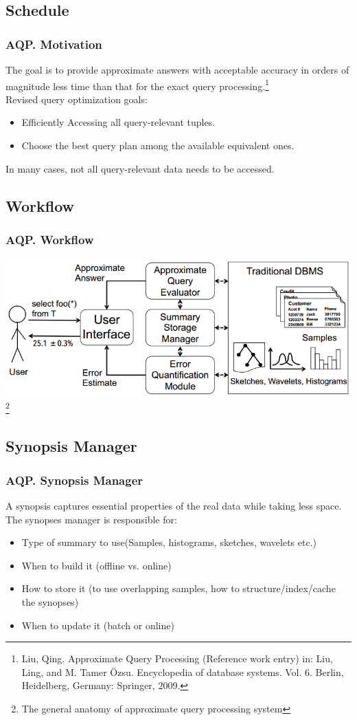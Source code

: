 \documentclass{beamer}
\begin{document}
\subsection{Schedule}
\begin{frame}
\frametitle{AQP. Motivation}
The goal is to provide approximate answers with acceptable accuracy in orders of magnitude less time than that for the exact query processing.\footnote{Liu, Qing. Approximate Query Processing (Reference work entry) in: Liu, Ling, and M. Tamer Özsu. Encyclopedia of database systems. Vol. 6. Berlin, Heidelberg, Germany: Springer, 2009.}\\
\vspace{0.3 cm}
Revised query optimization goals:
\begin{itemize}
\item{Efficiently Accessing all query-relevant tuples.}
\item{Choose the best query plan among the available equivalent ones.}
\end{itemize}
In many cases, not all query-relevant data needs to be accessed.

\end{frame}

\subsection{Workflow}
\begin{frame}
\frametitle{AQP. Workflow}
\includegraphics[scale=0.5]{img/blinkdb-workflow.png}
\footnote{The general anatomy of approximate query processing system}
\end{frame}

\subsection{Synopsis Manager}
\begin{frame}
\frametitle{AQP. Synopsis Manager}
A synopsis captures essential properties of the real data while taking less space.\\
\vspace{0.3 cm}
The synopses manager is responsible for:
\begin{itemize}
\item{Type of summary to use(Samples, histograms, sketches, wavelets etc.)}
\item{When to build it (offline vs. online)}
\item{How to store it (to use overlapping samples, how to structure/index/cache the synopses)}
\item{When to update it (batch or online)}
\end{itemize}
\end{frame}
\end{document}
